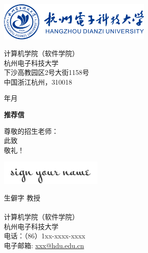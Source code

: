 \documentclass[12pt, a4paper]{letter} %
\renewcommand{\today}{\number\year 年\number\month 月}
\begin{document}
    \begin{minipage}{0.5\textwidth}
        \includegraphics[width=3in]{pic/HDU_Logo.png}\\
    \end{minipage}
    \hfill
    \begin{minipage}{0.6\textwidth}\raggedright
        \small{
            \hphantom{AA}计算机学院（软件学院） \\
            \hphantom{AA}杭州电子科技大学 \\
            \hphantom{AA}下沙高教园区2号大街1158号 \\
            \hphantom{AA}中国浙江杭州，310018 \\
        }
    \end{minipage}

    \vspace{0.4in} %

    \today

    \textbf{推荐信}

    尊敬的招生老师：\\

    
    \hspace*{2em}此致\\
    敬礼！

    \includegraphics[width=2in]{pic/signature.png} %

    生僻字 \hspace*{1em}教授 \\ \\ %
    计算机学院（软件学院） \\
    杭州电子科技大学 \\
    电话：（86）1xx-xxxx-xxxx \\ 
    电子邮箱: \href{mailto:xxx@hdu.edu.cn}{xxx@hdu.edu.cn} \\
\end{document}
